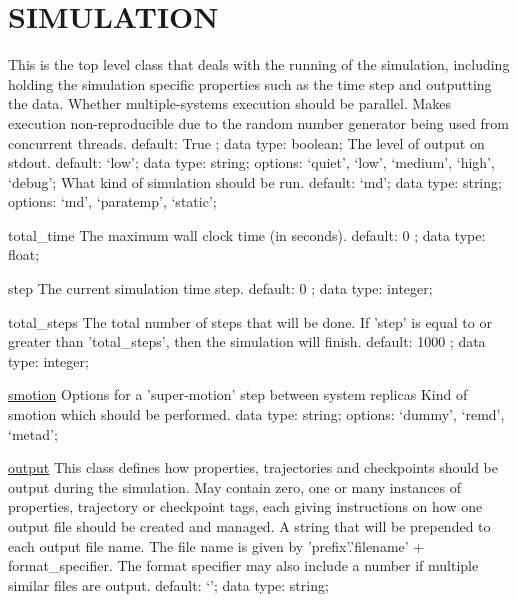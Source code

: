 \section{SIMULATION}
\label{SIMULATION}
\begin{ipifield}{}%
{This is the top level class that deals with the running of the simulation, including holding the simulation specific properties such as the time step and outputting the data.}%
{}%
{%
{Whether multiple-systems execution should be parallel. Makes execution non-reproducible due to the random number generator being used from concurrent threads.}%
{default:  True ; data type: boolean; }%
%
{The level of output on stdout.}%
{default: `low'; data type: string; options: `quiet', `low', `medium', `high', `debug'; }%
%
{What kind of simulation should be run.}%
{default: `md'; data type: string; options: `md', `paratemp', `static'; }%
}
\begin{ipifield}{total\_time}%
{The maximum wall clock time (in seconds).}%
{default:  0 ; data type: float; }%
{}
\end{ipifield}
\begin{ipifield}{step}%
{The current simulation time step.}%
{default:  0 ; data type: integer; }%
{}
\end{ipifield}
\begin{ipifield}{total\_steps}%
{The total number of steps that will be done. If 'step' is equal to or greater than 'total\_steps', then the simulation will finish.}%
{default:  1000 ; data type: integer; }%
{}
\end{ipifield}
\begin{ipifield}{\hyperref[SMOTION]{smotion}}%
{Options for a 'super-motion' step between system replicas}%
{}%
{%
{Kind of smotion which should be performed.}%
{data type: string; options: `dummy', `remd', `metad'; }%
}
\end{ipifield}
\begin{ipifield}{\hyperref[OUTPUTS]{output}}%
{This class defines how properties, trajectories and checkpoints should be output during the simulation. May contain zero, one or many instances of properties, trajectory or checkpoint tags, each giving instructions on how one output file should be created and managed.}%
{}%
{%
{A string that will be prepended to each output file name. The file name is given by 'prefix'.'filename' + format\_specifier. The format specifier may also include a number if multiple similar files are output.}%
{default: `'; data type: string; }%
}
\end{ipifield}
\end{ipifield}
